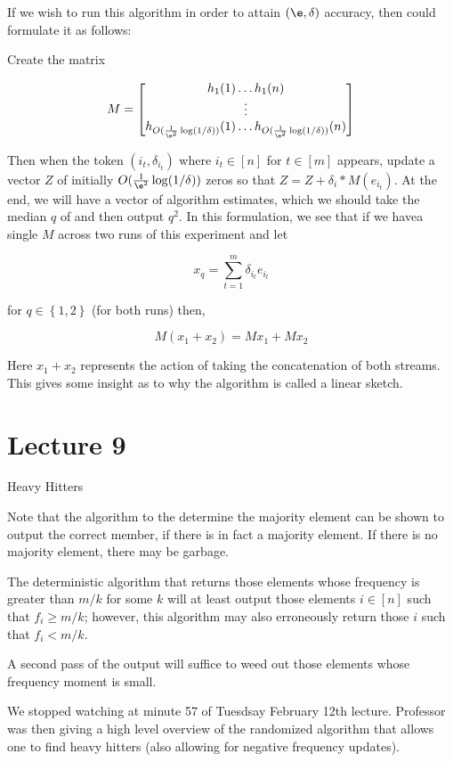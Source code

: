 \documentclass[../main.tex]{subfiles}
\begin{document}
\begin{remark}
    If we wish to run this algorithm in order to attain $(\e, \delta)$ accuracy, then could formulate it as follows:

    Create the matrix

    \[
        M = \begin{bmatrix}
            h_1(1) \dots h_1(n) \\
            \vdots \\
            h_{O(\frac{1}{\e^2} \log(1/\delta))}(1) \dots h_{O(\frac{1}{\e^2} \log(1/\delta))}(n)
        \end{bmatrix}
    \]

    Then when the token $(i_t, \delta_{i_t})$ where $i_t \in [n]$ for $t \in [m]$ appears, update a vector $Z$ of initially $O(\frac{1}{\e^2} \log(1/\delta))$ zeros so that $Z = Z + \delta_i * M(e_{ i_t })$. At the end, we will have a vector of algorithm estimates, which we should take the median $q$ of and then output $q^2$. In this formulation, we see that if we havea single $M$ across two runs of this experiment and let

    \[
        x_q = \sum_{t=1}^{m}\delta_{i_t}e_{i_t}
    \]

    for $q \in \left\{ 1,2 \right\}$ (for both runs) then,

    \[
        M(x_1 + x_2) = Mx_1 + Mx_2
    \]

    Here $x_1 + x_2$ represents the action of taking the concatenation of both streams. This gives some insight as to why the algorithm is called a linear sketch.
\end{remark}


\section{Lecture 9}{Heavy Hitters}

\begin{remark}
    Note that the algorithm to the determine the majority element can be shown to output the correct member, if there is in fact a majority element. If there is no majority element, there may be garbage.
\end{remark}

\begin{remark}
    The deterministic algorithm that returns those elements whose frequency is greater than $m/k$ for some $k$ will at least output those elements $i \in [n]$ such that $f_i \geq m/k$; however, this algorithm may also erroneously return those $i$ such that $f_i < m/k$.
    \begin{unresolved}
        A second pass of the output will suffice to weed out those elements whose frequency moment is small.
    \end{unresolved}

\end{remark}

We stopped watching at minute 57 of Tuesdsay February 12th lecture. Professor was then giving a high level overview of the randomized algorithm that allows one to find heavy hitters (also allowing for negative frequency updates).
\end{document}
